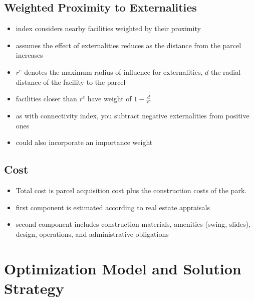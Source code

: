 \documentclass{article}
\begin{document}
\subsection{Weighted Proximity to Externalities}
\begin{itemize}
\item index considers nearby facilities weighted by their proximity
\item assumes the effect of externalities reduces as the distance from the parcel increases
\item $r^e$ denotes the maximum radius of influence for externalities, $d$ the radial distance of the facility to the parcel
\item facilities closer than $r^e$ have weight of $1-\frac{d}{r^e}$
\item as with connectivity index, you subtract negative externalities from positive ones
\item could also incorporate an importance weight
\end{itemize}
%
%
\subsection{Cost}
\begin{itemize}
\item Total cost is parcel acquisition cost plus the construction costs of the park.
\item first component is estimated according to real estate appraisals
\item second component includes construction materials, amenities (swing, slides), design, operations, and administrative obligations
\end{itemize}

%
%
\section{Optimization Model and Solution Strategy}
\end{document}
